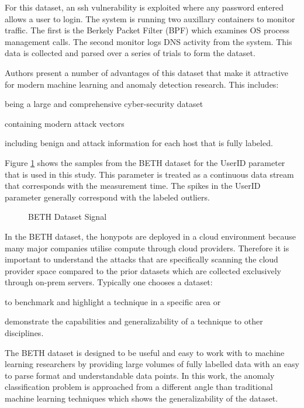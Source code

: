 For this dataset, an ssh vulnerability is exploited where any password entered allows a user to login. The system is running two auxillary containers to monitor traffic. The first is the Berkely Packet Filter (BPF) which examines OS process management calls. The second monitor logs DNS activity from the system. This data is collected and parsed over a series of trials to form the dataset.

Authors \cite{beth-dataset} present a number of advantages of this dataset that make it attractive for modern machine learning and anomaly detection research. This includes:
\begin{inlinelist}
    \item being a large and comprehensive cyber-security dataset
    \item containing modern attack vectors
    \item including benign and attack information for each host that is fully labeled.
\end{inlinelist}

Figure \ref{fig:beth_userid_all} shows the samples from the BETH dataset for the UserID parameter that is used in this study. This parameter is treated as a continuous data stream that corresponds with the measurement time. The spikes in the UserID parameter generally correspond with the labeled outliers.

\begin{figure}[H]
    
    \caption{BETH Dataset Signal}
    \label{fig:beth_userid_all}
\end{figure}

In the BETH dataset, the honypots are deployed in a cloud environment because many major companies utilise compute through cloud providers. Therefore it is important to understand the attacks that are specifically scanning the cloud provider space compared to the prior datasets which are collected exclusively through on-prem servers. Typically one chooses a dataset:
\begin{inlinelist}
    \item to benchmark and highlight a technique in a specific area or
    \item demonstrate the capabilities and generalizability of a technique to other disciplines.
\end{inlinelist}
The BETH dataset is designed to be useful and easy to work with to machine learning researchers by providing large volumes of fully labelled data with an easy to parse format and understandable data points. In this work, the anomaly classification problem is approached from a different angle than traditional machine learning techniques which shows the generalizability of the dataset.


